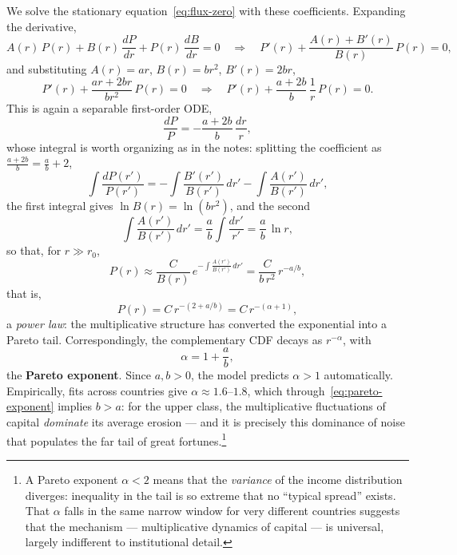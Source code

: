 We solve the stationary equation~\eqref{eq:flux-zero} with these coefficients.
Expanding the derivative,
\begin{equation}
A(r)\, P(r) + B(r)\,\frac{dP}{dr} + P(r)\,\frac{dB}{dr} = 0
\quad\Longrightarrow\quad
P'(r) + \frac{A(r) + B'(r)}{B(r)}\, P(r) = 0,
\end{equation}
and substituting $A(r) = ar$, $B(r) = br^2$, $B'(r) = 2br$,
\begin{equation}
P'(r) + \frac{ar + 2br}{br^2}\, P(r) = 0 \quad\Longrightarrow\quad P'(r) + \frac{a+2b}{b}\,\frac{1}{r}\, P(r) = 0.
\end{equation}
This is again a separable first-order ODE,
\begin{equation}
\frac{dP}{P} = -\frac{a+2b}{b}\,\frac{dr}{r},
\end{equation}
whose integral is worth organizing as in the notes: splitting the coefficient as $\frac{a+2b}{b} = \frac{a}{b} + 2$,
\begin{equation}
\int\!\frac{dP(r')}{P(r')} = -\int\!\frac{B'(r')}{B(r')}\, dr' - \int\!\frac{A(r')}{B(r')}\, dr',
\end{equation}
the first integral gives $\ln B(r) = \ln(br^2)$, and the second
\begin{equation}
\int\!\frac{A(r')}{B(r')}\, dr' = \frac{a}{b}\int\!\frac{dr'}{r'} = \frac{a}{b}\,\ln r,
\end{equation}
so that, for $r \gg r_0$,
\begin{equation}
P(r) \approx \frac{C}{B(r)}\, e^{-\int \frac{A(r')}{B(r')}\, dr'} = \frac{C}{b\,r^2}\, r^{-a/b},
\end{equation}
that is,
\begin{equation}\label{eq:pareto}
P(r) = C\, r^{-(2 + a/b)} = C\, r^{-(\alpha+1)},
\end{equation}
a \emph{power law}: the multiplicative structure has converted the exponential into a Pareto tail.
Correspondingly, the complementary CDF decays as $r^{-\alpha}$, with
\begin{equation}\label{eq:pareto-exponent}
\alpha = 1 + \frac{a}{b},
\end{equation}
the \textbf{Pareto exponent}.
Since $a, b > 0$, the model predicts $\alpha > 1$ automatically.
Empirically, fits across countries give $\alpha \approx 1.6$--$1.8$, which through~\eqref{eq:pareto-exponent} implies $b > a$: for the upper class, the multiplicative fluctuations of capital \emph{dominate} its average erosion --- and it is precisely this dominance of noise that populates the far tail of great fortunes.\footnote{A Pareto exponent $\alpha < 2$ means that the \emph{variance} of the income distribution diverges: inequality in the tail is so extreme that no ``typical spread'' exists. That $\alpha$ falls in the same narrow window for very different countries suggests that the mechanism --- multiplicative dynamics of capital --- is universal, largely indifferent to institutional detail.}

